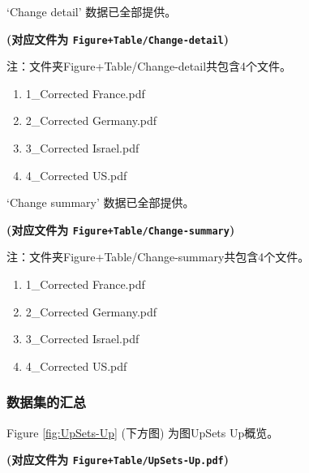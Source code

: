 \documentclass[
]{article}
\providecommand{\tightlist}{%
  \setlength{\itemsep}{0pt}\setlength{\parskip}{0pt}}
\begin{document}
`Change detail' 数据已全部提供。

\textbf{(对应文件为 \texttt{Figure+Table/Change-detail})}

\begin{center}\begin{tcolorbox}[colback=gray!10, colframe=gray!50, width=0.9\linewidth, arc=1mm, boxrule=0.5pt]注：文件夹Figure+Table/Change-detail共包含4个文件。

\begin{enumerate}\tightlist
\item 1\_Corrected France.pdf
\item 2\_Corrected Germany.pdf
\item 3\_Corrected Israel.pdf
\item 4\_Corrected US.pdf
\end{enumerate}\end{tcolorbox}
\end{center}

`Change summary' 数据已全部提供。

\textbf{(对应文件为 \texttt{Figure+Table/Change-summary})}

\begin{center}\begin{tcolorbox}[colback=gray!10, colframe=gray!50, width=0.9\linewidth, arc=1mm, boxrule=0.5pt]注：文件夹Figure+Table/Change-summary共包含4个文件。

\begin{enumerate}\tightlist
\item 1\_Corrected France.pdf
\item 2\_Corrected Germany.pdf
\item 3\_Corrected Israel.pdf
\item 4\_Corrected US.pdf
\end{enumerate}\end{tcolorbox}
\end{center}

\hypertarget{ux6570ux636eux96c6ux7684ux6c47ux603b}{%
\subsubsection{数据集的汇总}\label{ux6570ux636eux96c6ux7684ux6c47ux603b}}

Figure \ref{fig:UpSets-Up} (下方图) 为图UpSets Up概览。

\textbf{(对应文件为 \texttt{Figure+Table/UpSets-Up.pdf})}
\end{document}
